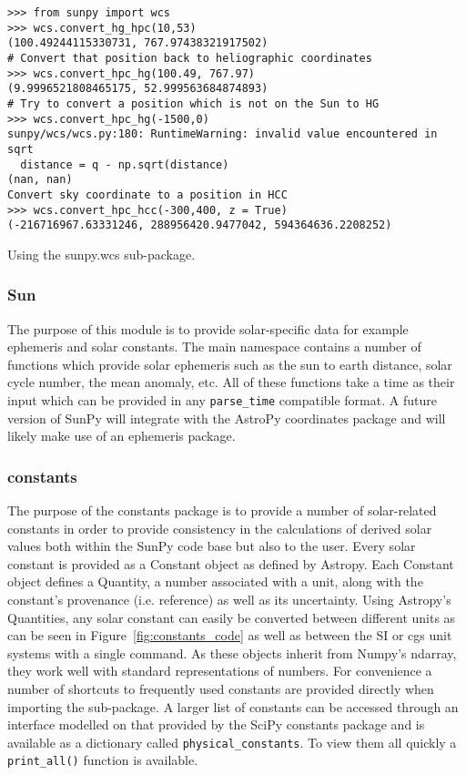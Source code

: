 \begin{listing}[H]
\begin{verbatim}
>>> from sunpy import wcs
>>> wcs.convert_hg_hpc(10,53)
(100.49244115330731, 767.97438321917502)
# Convert that position back to heliographic coordinates
>>> wcs.convert_hpc_hg(100.49, 767.97)
(9.9996521808465175, 52.999563684874893)
# Try to convert a position which is not on the Sun to HG
>>> wcs.convert_hpc_hg(-1500,0)
sunpy/wcs/wcs.py:180: RuntimeWarning: invalid value encountered in sqrt
  distance = q - np.sqrt(distance)
(nan, nan)
Convert sky coordinate to a position in HCC
>>> wcs.convert_hpc_hcc(-300,400, z = True)
(-216716967.63331246, 288956420.9477042, 594364636.2208252)
\end{verbatim}
\caption{Using the sunpy.wcs sub-package.}
\label{code:wcs_code}
\end{listing}

\subsubsection{Sun}\label{ssec:util:sun}
The purpose of this module is to provide solar-specific data for example ephemeris and
solar constants. The main namespace contains a number of functions which provide solar
ephemeris such as the sun to earth distance, solar cycle number, the mean anomaly, etc.
All of these functions take a time as their input which can be provided in any 
\texttt{parse\_time}
compatible format. 
A future version of SunPy will integrate with the AstroPy coordinates package and will 
likely make use of an ephemeris package.

\subsubsection{constants}\label{ssec:util:const}
The purpose of the constants package is to provide a number of solar-related 
constants in order to provide consistency in the calculations of derived solar 
values both within the SunPy code base but also to the user. Every solar 
constant is provided as a Constant object as defined by Astropy. Each 
Constant object defines a Quantity, a number associated with a unit, along with 
the constant's provenance (i.e. reference) as well as its uncertainty. Using 
Astropy's Quantities, any solar constant can easily be converted between 
different units as can be seen in Figure~\ref{fig:constants_code} as well
as between the SI or cgs unit systems with a single command.  As these objects inherit from 
Numpy's ndarray, they work well with standard representations of numbers.
For convenience a number of shortcuts to frequently used constants are provided 
directly when importing the sub-package. A larger list of constants can be 
accessed through an interface modelled on that provided by the SciPy constants 
package and is available as a dictionary called \texttt{physical\_constants}. 
To view them all quickly a \texttt{print\_all()} function is available.


